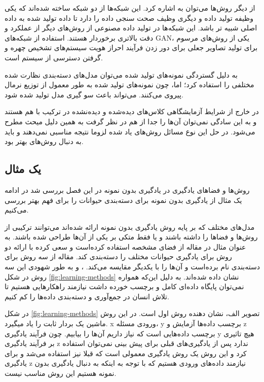 از دیگر روش‌ها می‌توان به
اشاره کرد. این شبکه‌ها از دو شبکه ساخته شده‌اند که یکی وظیفه تولید داده و دیگری وظیف صحت سنجی داده را دارد تا داده تولید شده به داده اصلی شبیه تر باشد. این شبکه‌ها در تولید داده مصنوعی از روش‌های دیگر از عملکرد و دقت بالاتری برخوردار هستند. استفاده از شبکه‌های GAN، یکی از روش‌های مرسوم برای تولید تصاویر جعلی برای دور زدن فرآیند احراز هویت سیستم‌های تشخیص چهره و گرفتن دسترسی از سیستم است.

به دلیل گستردگی نمونه‌های تولید شده می‌توان مدل‌های دسته‌بندی نظارت شده مختلفی را استفاده کرد؛ اما، چون نمونه‌های تولید شده به طور معمول از توزیع نرمال پیروی می‌کنند. می‌تواند باعث سو گیری مدل تولید شده شود.

در خارج از شرایط آزمایشگاهی کلاس‌های دیده‌شده و دیده‌نشده در ترکیب با هم هستند و به این سادگی نمی‌توان آن‌ها را جدا از هم در نظر گرفت به همین دلیل میحث
مطرح می‌شود. در حل این نوع مسائل روش‌های یاد شده لزوما نتیجه مناسبی نمی‌دهند و باید به دنبال روش‌های بهتر بود.

\subsection{یک مثال}
روش‌ها و فضاهای یادگیری در یادگیری بدون نمونه در این فصل بررسی شد در ادامه یک مثال از یادگیری بدون نمونه برای دسته‌بندی حیوانات را برای فهم بهتر بررسی می‌کنیم.

مدل‌های مختلف که بر پایه روش یادگیری بدون نمونه ارائه شده‌اند می‌توانند ترکیبی از روش‌ها و فضا‌ها را داشته باشند و یا فقط متکی بر یکی از آن‌ها طراحی شده باشند. به عنوان مثال در مقاله
\cite{Lampert2014}
از فضای مشخصه استفاده کرده‌است و سعی کرده با ارائه دو روش برای یادگیری حیوانات مختلف را دسته‌بندی کند. مقاله از سه روش برای دسته‌بندی نام برده‌است و آن‌ها را با یکدیگر مقایسه می‌کند.
،
 و
به طور شهودی این سه روش در شکل
\ref{fig:learning-methods}
نشان داده شده‌اند.
به دلیل این‌که همواره نمی‌توان پایگاه داده‌ای کامل و برچسب خورده داشت نیازمند راهکار‌هایی هستیم تا تلاش انسان در جمع‌آوری و دسته‌بندی‌ داده‌ها را کم کنیم.

در شکل
\ref{fig:learning-methods}
تصویر الف، نشان دهنده روش اول است. در این روش ماشین یک بردار ثابت را یاد میگیرد. x ورودی مسئله، y برچسب‌ داده‌ها آزمایش و z برچسب داده‌هایی است که نیاز داریم آن‌ها را بیابیم. چون فرآيند یادگیری y هیچ تاثیری بر فرآیند یادگیری z ندارد پس از یادگیری‌های قبلی برای پیش بینی نمی‌توان استفاده کرد و این روش یک روش یادگیری معمولی است که قبلا نیز استفاده می‌شد و برای یادگیری z نیازمند داده‌های ورودی هستیم که با توجه به اینکه به دنبال یادگیری بدون نمونه هستیم این روش مناسب نیست.

